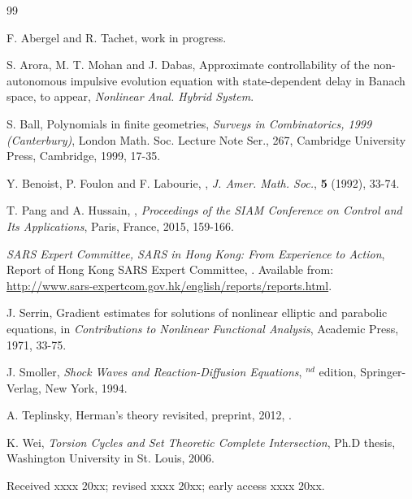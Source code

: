 \documentclass{aims} %
\theoremstyle{definition}
\begin{document}
\begin{thebibliography}{99}

\newblock F. Abergel and R. Tachet,
\newblock
\newblock work in progress.

\newblock S. Arora, M. T. Mohan and J. Dabas,
\newblock Approximate controllability of the non-autonomous impulsive evolution equation with state-dependent delay in Banach space,
\newblock to appear, \emph{Nonlinear Anal. Hybrid System}.

\newblock S. Ball,
\newblock Polynomials in finite geometries,
\newblock \emph{Surveys in Combinatorics, 1999 (Canterbury)}, London Math. Soc. Lecture Note Ser., 267, Cambridge University Press, Cambridge, 1999, 17-35.

\newblock Y. Benoist, P. Foulon and F. Labourie,
\newblock {},
\newblock \emph{J. Amer. Math. Soc.}, \textbf{5} (1992), 33-74.

\newblock T. Pang and A. Hussain,
\newblock {},
\newblock \emph{Proceedings of the SIAM Conference on Control and Its Applications}, Paris, France, 2015, 159-166.

\newblock
\newblock \emph{SARS Expert Committee, SARS in Hong Kong: From Experience to Action}, Report of Hong Kong SARS Expert Committee,
. Available from: \url{http://www.sars-expertcom.gov.hk/english/reports/reports.html}.

\newblock J. Serrin,
\newblock Gradient estimates for solutions of nonlinear elliptic and parabolic equations,
\newblock in \emph{Contributions to Nonlinear Functional Analysis}, Academic Press, 1971, 33-75.

\newblock J. Smoller,
\newblock \emph{Shock Waves and Reaction-Diffusion Equations},
$^{nd}$ edition, Springer-Verlag, New York, 1994.

\newblock A. Teplinsky,
\newblock Herman's theory revisited,
\newblock preprint, 2012, .

\newblock K. Wei,
\newblock \emph{Torsion Cycles and Set Theoretic Complete Intersection},
\newblock Ph.D thesis, Washington University in St. Louis, 2006.

\end{thebibliography}

\medskip
Received xxxx 20xx; revised xxxx 20xx; early access xxxx 20xx.
\medskip
\end{document}
